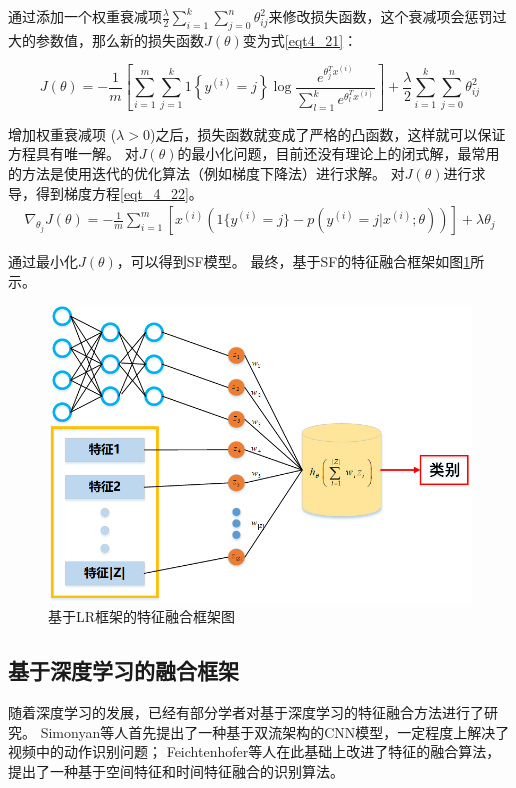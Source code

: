 通过添加一个权重衰减项$\frac{\lambda}{2} \sum_{i=1}^k \sum_{j=0}^{n} \theta_{ij}^2$来修改损失函数，这个衰减项会惩罚过大的参数值，那么新的损失函数$J(\theta)$变为式\eqref{eqt4_21}：\par
\begin{equation}
	\label{eqt4_21}
	J(\theta) = - \frac{1}{m} \left[ \sum_{i=1}^{m} \sum_{j=1}^{k} 1\left\{y^{(i)} 
	= j\right\} \log \frac{e^{\theta_j^T x^{(i)}}}{\sum_{l=1}^k e^{ \theta_l^T x^{(i)} }}  \right]
	+ \frac{\lambda}{2} \sum_{i=1}^k \sum_{j=0}^n \theta_{ij}^2
\end{equation}

增加权重衰减项 ($\lambda > 0$)之后，损失函数就变成了严格的凸函数，这样就可以保证方程具有唯一解。
对$J(\theta)$的最小化问题，目前还没有理论上的闭式解，最常用的方法是使用迭代的优化算法（例如梯度下降法）进行求解。
对$J(\theta)$进行求导，得到梯度方程\eqref{eqt_4_22}。
\begin{align}
	\label{eqt_4_22}
	\nabla_{\theta_j} J(\theta) = - \frac{1}{m} \sum_{i=1}^{m}{ \left[ x^{(i)} ( 1\{ y^{(i)} = j\}  - p(y^{(i)} = j | x^{(i)}; \theta) ) \right]  } + \lambda \theta_j
\end{align}

通过最小化$J(\theta)$，可以得到SF模型。
最终，基于SF的特征融合框架如图\ref{sec:fig_4_2}所示。\par
\begin{figure}[!h]
	\centering
	\includegraphics[scale=0.7]{figures/chapter_4/fig_4_2}
	\caption{基于LR框架的特征融合框架图}\label{sec:fig_4_2}
\end{figure}


\subsection{基于深度学习的融合框架}
随着深度学习的发展，已经有部分学者对基于深度学习的特征融合方法进行了研究。
Simonyan等人首先提出了一种基于双流架构的CNN模型，一定程度上解决了视频中的动作识别问题\cite{simonyan2014two}；
Feichtenhofer等人在此基础上改进了特征的融合算法，提出了一种基于空间特征和时间特征融合的识别算法\cite{feichtenhofer2016convolutional}。\par

